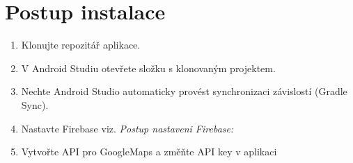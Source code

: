 \section{Postup instalace}
\begin{enumerate}
    \item Klonujte repozitář aplikace.
    \item V Android Studiu otevřete složku s klonovaným projektem.
    \item Nechte Android Studio automaticky provést synchronizaci závislostí (Gradle Sync).
    \item Nastavte Firebase viz. \textit{Postup nastaveni Firebase:}
    \item Vytvořte API pro GoogleMaps a změňte API key v aplikaci 
\end{enumerate}

